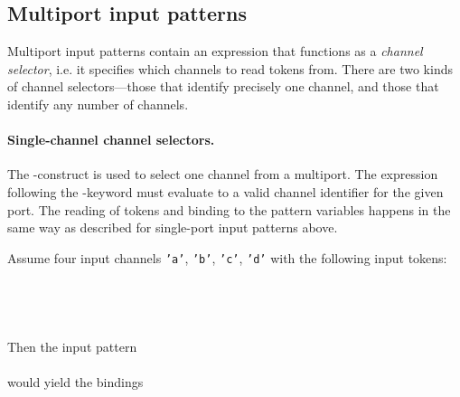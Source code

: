 \subsection{Multiport input patterns}



Multiport input patterns
contain an expression that functions as a {\em channel selector}, i.e.
it specifies which channels to read tokens from. There are two kinds of
channel selectors---those that identify precisely one channel, and
those that identify any number of channels.


\paragraph{Single-channel channel selectors.} The \kwAt-construct is used to select one
channel from a multiport. The expression following the \kwAt-keyword
must evaluate to a valid channel identifier for the given port. The
reading of tokens and binding to the pattern variables happens in the
same way as described for single-port input patterns above.

\begin{example}
  Assume four input channels {\tt 'a'}, {\tt 'b'}, {\tt 'c'}, {\tt 'd'} with the following input tokens:\\
  \\
  \\
  \\
  \\
  Then the input pattern\\
  \\
  would yield the bindings\\
\end{example}


